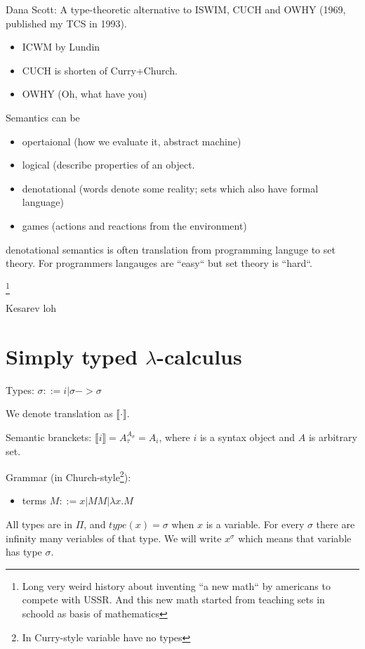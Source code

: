 \documentclass[a4paper,10pt]{book}
\begin{document}
Dana Scott:  A type-theoretic alternative to ISWIM, CUCH and OWHY (1969, published my TCS in 1993).

\begin{itemize}
\item ICWM by Lundin
\item CUCH is shorten of Curry+Church.
\item OWHY (Oh, what have you)
\end{itemize}

Semantics can be 
\begin{itemize}
\item opertaional (how we evaluate it, abstract machine)
\item logical (describe properties of an object.
\item denotational (words denote some reality; sets which also have formal language)
\item games (actions and reactions from the environment)
\end{itemize}

denotational semantics is often translation from programming languge to set theory. For programmers 
langauges are ``easy`` but set theory is ``hard``.

\footnote{Long very weird history about inventing ``a new math`` by americans to compete with USSR.
And this new math started from teaching sets in schoold as basis of mathematics}

Kesarev loh
\chapter{Simply typed $\lambda$-calculus}

Types: $\sigma ::= i | \sigma -> \sigma$

We denote translation as $\llbracket \cdot \rrbracket$.

Semantic branckets: $\llbracket i \rrbracket = A_{\tau}^{A_\sigma} = A_i $, 
where $i$ is a syntax object and $A$ is arbitrary set.

Grammar (in Church-style\footnote{In Curry-style variable have no types}): 
\begin{itemize}
 \item terms $M ::= x | MM | \lambda x . M$
\end{itemize}
All types are in $\Pi$, and $type(x) = \sigma$ when $x$ is a variable. For every $\sigma$ there 
are infinity many veriables of that type. We will write $x^\sigma$ which means that variable has 
type $\sigma$.
\end{document}
